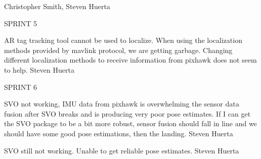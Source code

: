 \begin{description}
\hfill{Christopher Smith, Steven Huerta}

\item SPRINT 5

\item [2/22/16]  AR tag tracking tool cannot be used to localize. When using the localization methods provided by mavlink protocol, we are getting garbage. Changing different localization methods to receive information from pixhawk does not seem to help. \hfill{Steven Huerta}

\item SPRINT 6

\item [3/28/16]  SVO not working, IMU data from pixhawk is overwhelming the sensor data fusion after SVO breaks and is producing very poor pose estimates. If I can get the SVO package to be a bit more robust, sensor fusion should fall in line and we should have some good pose estimations, then the landing. \hfill{Steven Huerta}

\item [4/4/16]  SVO still not working. Unable to get reliable pose estimates.  \hfill{Steven Huerta}
\end{description}